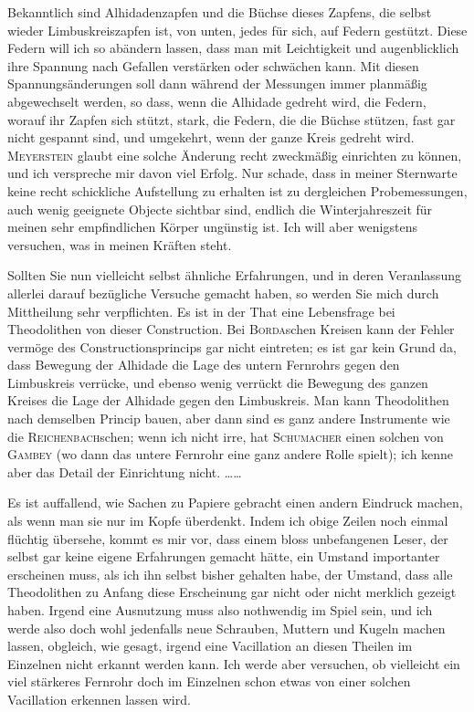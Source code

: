 \documentclass[12pt,a4paper]{article}
\theoremstyle{plain}
\theoremstyle{definition}
\theoremstyle{remark}
\begin{document}
Bekanntlich sind Alhidadenzapfen und die B\"uchse dieses Zapfens, die selbst wieder Limbuskreiszapfen ist, von unten, jedes f\"ur sich, auf Federn gest\"utzt. Diese Federn will ich so ab\"andern lassen, dass man mit Leichtigkeit und augenblicklich ihre Spannung nach Gefallen verst\"arken oder schw\"achen kann. Mit diesen Spannungs\"anderungen soll dann w\"ahrend der Messungen immer planm\"a\ss ig abgewechselt werden, so dass, wenn die Alhidade gedreht wird, die Federn, worauf ihr Zapfen sich st\"utzt, stark, die Federn, die die B\"uchse st\"utzen, fast gar nicht gespannt sind, und umgekehrt, wenn der ganze Kreis gedreht wird. \textsc{Meyerstein} glaubt eine solche \"Anderung recht zweckm\"a\ss ig einrichten zu k\"onnen, und ich verspreche mir davon viel Erfolg. Nur schade, dass in meiner Sternwarte keine recht schickliche Aufstellung zu erhalten ist zu dergleichen Probemessungen, auch wenig geeignete Objecte sichtbar sind, endlich die Winterjahreszeit f\"ur meinen sehr empfindlichen K\"orper ung\"unstig ist. Ich will aber wenigstens versuchen, was in meinen Kr\"aften steht.

Sollten Sie nun vielleicht selbst \"ahnliche Erfahrungen, und in deren Veranlassung allerlei darauf bez\"ugliche Versuche gemacht haben, so werden Sie mich durch Mittheilung sehr verpflichten. Es ist in der That eine Lebensfrage bei Theodolithen von dieser Construction. Bei \textsc{Borda}schen Kreisen kann der Fehler verm\"oge des Constructionsprincips gar nicht eintreten; es ist gar kein Grund da, dass Bewegung der Alhidade die Lage des untern Fernrohrs gegen den Limbuskreis verr\"ucke, und ebenso wenig verr\"uckt die Bewegung des ganzen Kreises die Lage der Alhidade gegen den Limbuskreis. Man kann Theodolithen nach demselben Princip bauen, aber dann sind es ganz andere Instrumente wie die \textsc{Reichenbach}schen; wenn ich nicht irre, hat \textsc{Schumacher} einen solchen von \textsc{Gambey} (wo dann das untere Fernrohr eine ganz andere Rolle spielt); ich kenne aber das Detail der Einrichtung nicht. \ldots\ldots

Es ist auffallend, wie Sachen zu Papiere gebracht einen andern Eindruck machen, als wenn man sie nur im Kopfe \"uberdenkt. Indem ich obige Zeilen noch einmal fl\"uchtig \"ubersehe, kommt es mir vor, dass einem bloss unbefangenen Leser, der selbst gar keine eigene Erfahrungen gemacht h\"atte, ein Umstand importanter erscheinen muss, als ich ihn selbst bisher gehalten habe, der Umstand, dass alle Theodolithen zu Anfang diese Erscheinung gar nicht oder nicht merklich gezeigt haben. Irgend eine Ausnutzung muss also nothwendig im Spiel sein, und ich werde also doch wohl jedenfalls neue Schrauben, Muttern und Kugeln machen lassen, obgleich, wie gesagt, irgend eine Vacillation an diesen Theilen im Einzelnen nicht erkannt werden kann. Ich werde aber versuchen, ob vielleicht ein viel st\"arkeres Fernrohr doch im Einzelnen schon etwas von einer solchen Vacillation erkennen lassen wird.
\end{document}
